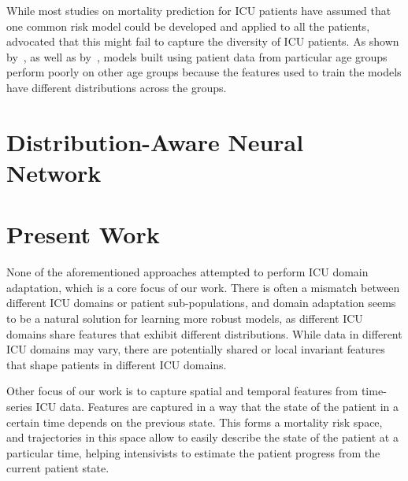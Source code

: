While most studies on mortality prediction for ICU patients have assumed that one common risk model could be developed and applied to all the patients,~\citet{nori} advocated that this might fail to capture the diversity of ICU patients. As shown by~\citet{lifetime}, as well as by~\citet{longi}, models built using patient data from particular age groups perform poorly on other age groups because the features used to train the models have different distributions across the groups.

\section{Distribution-Aware Neural Network}


\section{Present Work}

None of the aforementioned approaches attempted to perform ICU domain adaptation, which is a core focus of our work. There is often a mismatch between different ICU domains or patient sub-populations, and domain adaptation seems to be a natural solution for learning more robust models, as different ICU domains share features that exhibit different distributions. While data in different ICU domains may vary, there are potentially shared or local invariant features that shape patients in different ICU domains.

Other focus of our work is to capture spatial and temporal features from time-series ICU data. Features are captured in a way that the state of the patient in a certain time depends on the previous state. This forms a mortality risk space, and trajectories in this space allow to easily describe the state of the patient at a particular time, helping intensivists to estimate the patient progress from the current patient state.